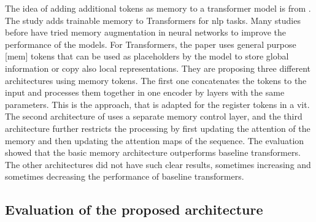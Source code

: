 \documentclass[conference]{IEEEtran}
\begin{document}
  The idea of adding additional tokens as memory to a transformer model is from \cite{memorytransformer}. The study adds trainable memory to Transformers for \ac{nlp} tasks. Many studies before have tried memory augmentation in neural networks to improve the performance of the models. For Transformers, the paper uses general purpose [mem] tokens that can be used as placeholders by the model to store global information or copy also local representations. They are proposing three different architectures using memory tokens. The first one concatenates the tokens to the input and processes them together in one encoder by layers with the same parameters. This is the approach, that is adapted for the register tokens in a \ac{vit}. The second architecture of \cite{memorytransformer} uses a separate memory control layer, and the third architecture further restricts the processing by first updating the attention of the memory and then updating the attention maps of the sequence. The evaluation showed that the basic memory architecture outperforms baseline transformers. The other architectures did not have such clear results, sometimes increasing and sometimes decreasing the performance of baseline transformers.

  \subsection{Evaluation of the proposed architecture}
  \label{sec:registers:evaluation}
\end{document}
